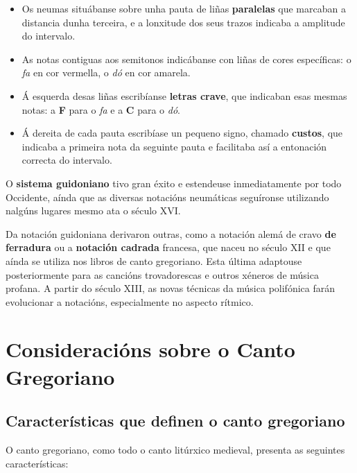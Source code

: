 \documentclass[a4paper, twoside]{templates/ociamthesis}
\providecommand{\tightlist}{%
  \setlength{\itemsep}{0pt}\setlength{\parskip}{0pt}}
\begin{document}
\begin{itemize}
\tightlist
\item
  Os neumas situábanse sobre unha pauta de liñas \textbf{paralelas} que marcaban a distancia dunha terceira, e a lonxitude dos seus trazos indicaba a amplitude do intervalo.
\item
  As notas contiguas aos semitonos indicábanse con liñas de cores específicas: o \emph{fa} en cor vermella, o \emph{dó} en cor amarela.
\item
  Á esquerda desas liñas escribíanse \textbf{letras crave}, que indicaban esas mesmas notas: a \textbf{F} para o \emph{fa} e a \textbf{C} para o \emph{dó}.
\item
  Á dereita de cada pauta escribíase un pequeno signo, chamado \textbf{custos}, que indicaba a primeira nota da seguinte pauta e facilitaba así a entonación correcta do intervalo.
\end{itemize}

O \textbf{sistema guidoniano} tivo gran éxito e estendeuse inmediatamente por todo Occidente, aínda que as diversas notacións neumáticas seguíronse utilizando nalgúns lugares mesmo ata o século XVI.

Da notación guidoniana derivaron outras, como a notación alemá de cravo \textbf{de ferradura} ou a \textbf{notación cadrada} francesa, que naceu no século XII e que aínda se utiliza nos libros de canto gregoriano. Esta última adaptouse posteriormente para as cancións trovadorescas e outros xéneros de música profana. A partir do século XIII, as novas técnicas da música polifónica farán evolucionar a notacións, especialmente no aspecto rítmico.

\newpage

\hypertarget{consideraciuxf3ns-sobre-o-canto-gregoriano}{%
\section{Consideracións sobre o Canto Gregoriano}\label{consideraciuxf3ns-sobre-o-canto-gregoriano}}

\hypertarget{caracteruxedsticas-que-definen-o-canto-gregoriano}{%
\subsection{Características que definen o canto gregoriano}\label{caracteruxedsticas-que-definen-o-canto-gregoriano}}

O canto gregoriano, como todo o canto litúrxico medieval, presenta as seguintes características:
\end{document}
